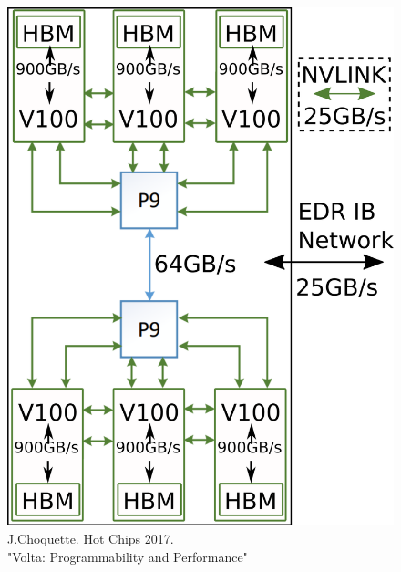 \documentclass[aspectratio=169]{beamer}
\begin{document}
\begin{frame}
\begin{columns}
\begin{column}{0.3\textwidth}
\begin{figure}
        \includegraphics[width=.9\textwidth]{figures/summit-node.png}\\
        \tiny{J.Choquette. Hot Chips 2017. \\"Volta: Programmability and Performance"}
      \end{figure}
    \end{column}
  \end{columns}
\end{frame}
\end{document}
